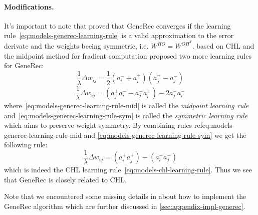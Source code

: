 \paragraph{Modifications.}
\label{sec:models-generec-modifications} 
It's important to note that \citet{o1996bio} proved that GeneRec converges if the learning rule~\ref{eq:models-generec-learning-rule} is a valid approximation to the error derivate and the weights beeing symmetric, i.e. $W^{HO} = W^{OH^{T}}$. \citet{o1996bio} based on CHL and the midpoint method for fradient computation \citep{press1990numerical} proposed two more learning rules for GeneRec: 
\begin{equation}
  \label{eq:models-generec-learning-rule-mid}
  \frac{1}{\lambda} \Delta w_{ij} =  \frac{1}{2}(a^{-}_i + a^{+}_i)(a^{+}_j - a^{-}_j)
\end{equation}
\begin{equation}
  \label{eq:models-generec-learning-rule-sym}
  \frac{1}{\lambda} \Delta w_{ij} =  (a^{+}_j a^{-}_i - a^{-}_j a^{+}_i) - 2a^{-}_j a^{-}_i
\end{equation}
where~\ref{eq:models-generec-learning-rule-mid} is called the \emph{midpoint learning rule} and~\ref{eq:models-generec-learning-rule-sym} is called the \emph{symmetric learning rule} which aims to preserve weight symmetry. By combining rules ref{eq:models-generec-learning-rule-mid} and \ref{eq:models-generec-learning-rule-sym} we get the following rule: 
\begin{equation}
  \label{eq:models-generec-learning-rule-chl}
  \frac{1}{\lambda} \Delta w_{ij} =  (a^{+}_i a^{+}_j) - (a^{-}_i a^{-}_j)
\end{equation}
which is indeed the CHL learning rule~\ref{eq:models-chl-learning-rule}. Thus we see that GeneRec is closely related to CHL. 

Note that we encountered some missing details in \citet{o1996bio} about how to implement the GeneRec algorithm which are further discussed in \ref{sec:appendix-impl-generec}.
